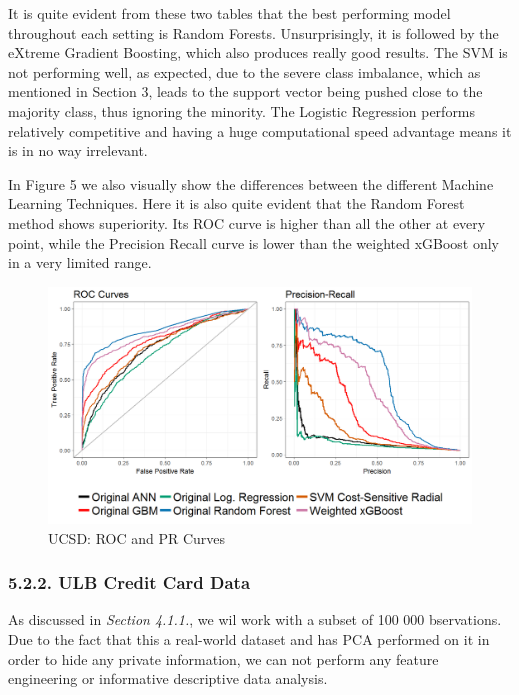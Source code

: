 \documentclass[12pt,]{article}
\begin{document}
It is quite evident from these two tables that the best performing model
throughout each setting is Random Forests. Unsurprisingly, it is
followed by the eXtreme Gradient Boosting, which also produces really
good results. The SVM is not performing well, as expected, due to the
severe class imbalance, which as mentioned in Section 3, leads to the
support vector being pushed close to the majority class, thus ignoring
the minority. The Logistic Regression performs relatively competitive
and having a huge computational speed advantage means it is in no way
irrelevant.

In Figure 5 we also visually show the differences between the different
Machine Learning Techniques. Here it is also quite evident that the
Random Forest method shows superiority. Its ROC curve is higher than all
the other at every point, while the Precision Recall curve is lower than
the weighted xGBoost only in a very limited range.

\begin{figure}
\centering
\includegraphics[width=1\textwidth,height=\textheight]{figures/ucsd/ucsd_pr_roc.png}
\caption{UCSD: ROC and PR Curves}
\end{figure}

\hypertarget{ulb-credit-card-data}{%
\subsubsection{5.2.2. ULB Credit Card Data}\label{ulb-credit-card-data}}

As discussed in \emph{Section 4.1.1.}, we wil work with a subset of 100
000 bservations. Due to the fact that this a real-world dataset and has
PCA performed on it in order to hide any private information, we can not
perform any feature engineering or informative descriptive data
analysis.
\end{document}
